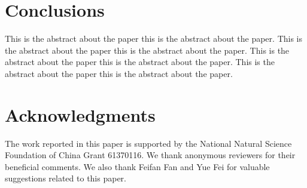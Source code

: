 \documentclass{sig-alternate-05-2015}
\begin{document}
\section{Conclusions}
This is the abstract about the paper this is the abstract about the paper.
This is the abstract about the paper this is the abstract about the paper.
This is the abstract about the paper this is the abstract about the paper.
This is the abstract about the paper this is the abstract about the paper.

\section{Acknowledgments}
The work reported in this paper is supported by the National Natural Science Foundation of China Grant 61370116.
We thank anonymous reviewers for their beneficial comments.
We also thank Feifan Fan and Yue Fei for valuable suggestions related to this paper.



\end{document}
